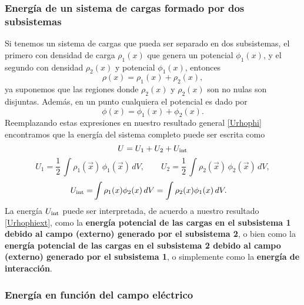 \subsubsection{Energía de un sistema de cargas formado por dos subsistemas}
Si tenemos un sistema de cargas que pueda ser separado en dos subsistemas, el primero con densidad de carga $\rho_1(x)$ que genera un potencial $\phi_1(x)$, y el segundo con densidad $\rho_2(x)$ y potencial $\phi_1(x)$, entonces 
\begin{equation}
\rho(x)=\rho_1(x)+\rho_2(x),
\end{equation}
ya suponemos que las regiones donde $\rho_2(x)$ y $\rho_2(x)$ son no nulas son disjuntas. Además, en un punto cualquiera el potencial es dado por
\begin{equation}
\phi(x)=\phi_1(x)+\phi_2(x).
\end{equation}
Reemplazando estas expresiones en nuestro resultado general \eqref{Urhophi} encontramos que  la energía del sistema completo puede ser escrita como
\begin{equation}
U=U_1+U_2+U_{\rm int}
\end{equation}
\begin{equation}
U_1= \frac{1}{2}\,\int\rho_1(\vec{x})\,\phi_1(\vec{x})\,dV ,\qquad U_2= \frac{1}{2}\,\int\rho_2(\vec{x})\,\phi_2(\vec{x})\,dV,
\end{equation}
\begin{align}
U_{\rm int} =& \int \rho_1(x)\phi_2(x)\,dV = \int \rho_2(x)\phi_1(x)\,dV.
\end{align}
La energía $U_{\rm int}$ puede ser interpretada, de acuerdo a nuestro resultado \eqref{Urhophiext}, como la \textbf{energía potencial de las cargas en el subsistema 1 debido al campo (externo) generado por el subsistema 2}, o bien como la \textbf{energía potencial de las cargas en el subsistema 2 debido al campo (externo) generado por el subsistema 1}, o simplemente como la \textbf{energía de interacción}.


\subsubsection{Energía en función del campo eléctrico}

